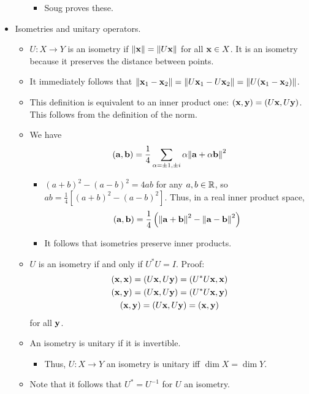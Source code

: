 \documentclass[../../notes.tex]{subfiles}
\begin{document}
\begin{itemize}
\begin{itemize}
\begin{itemize}
            \item Soug proves these.
        \end{itemize}
    \end{itemize}
    \item Isometries and unitary operators.
    \begin{itemize}
        \item $U:X\to Y$ is an isometry if $\norm{\mathbf{x}}=\norm{U\mathbf{x}}$ for all $\mathbf{x}\in X$. It is an isometry because it preserves the distance between points.
        \item It immediately follows that $\norm{\mathbf{x}_1-\mathbf{x}_2}=\norm{U\mathbf{x}_1-U\mathbf{x}_2}=\norm{U(\mathbf{x}_1-\mathbf{x}_2)}$.
        \item This definition is equivalent to an inner product one: $(\mathbf{x},\mathbf{y})=(U\mathbf{x},U\mathbf{y})$. This follows from the definition of the norm.
        \item We have
        \begin{equation*}
            (\mathbf{a},\mathbf{b}) = \frac{1}{4}\sum_{\alpha=\pm 1,\pm i}\alpha\norm{\mathbf{a}+\alpha\mathbf{b}}^2
        \end{equation*}
        \begin{itemize}
            \item $(a+b)^2-(a-b)^2=4ab$ for any $a,b\in\mathbb{R}$, so $ab=\frac{1}{4}[(a+b)^2-(a-b)^2]$. Thus, in a real inner product space,
            \begin{equation*}
                (\mathbf{a},\mathbf{b}) = \frac{1}{4}\left( \norm{\mathbf{a}+\mathbf{b}}^2-\norm{\mathbf{a}-\mathbf{b}}^2 \right)
            \end{equation*}
            \item It follows that isometries preserve inner products.
        \end{itemize}
        \item $U$ is an isometry if and only if $U^*U=I$. Proof:
        \begin{gather*}
            (\mathbf{x},\mathbf{x}) = (U\mathbf{x},U\mathbf{y}) = (U^*U\mathbf{x},\mathbf{x})\\
            (\mathbf{x},\mathbf{y}) = (U\mathbf{x},U\mathbf{y}) = (U^*U\mathbf{x},\mathbf{y})\\
            (\mathbf{x},\mathbf{y}) = (U\mathbf{x},U\mathbf{y}) = (\mathbf{x},\mathbf{y})
        \end{gather*}
        for all $\mathbf{y}$.
        \item An isometry is unitary if it is invertible.
        \begin{itemize}
            \item Thus, $U:X\to Y$ an isometry is unitary iff $\dim X=\dim Y$.
        \end{itemize}
        \item Note that it follows that $U^*=U^{-1}$ for $U$ an isometry.

\end{itemize}
\end{itemize}
\end{document}
